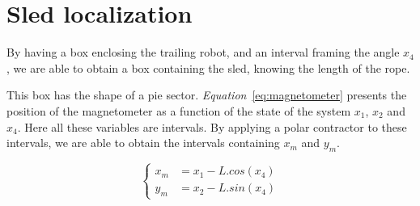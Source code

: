 \section*{Sled localization}
    By having a box enclosing the trailing robot, and an interval framing the angle $x_4$, we are able to obtain a box containing the sled, knowing the length of the rope.
    
    This box has the shape of a pie sector. \textit{Equation}~\ref{eq:magnetometer} presents the position of the magnetometer as a function of the state of the system $x_1$, $x_2$ and $x_4$. Here all these variables are intervals. By applying a polar contractor to these intervals, we are able to obtain the intervals containing $x_m$ and $y_m$.

    \begin{equation}\label{eq:magnetometer}
        \left\lbrace
            \begin{aligned}
                x_m &= x_1 - L.cos(x_4) \\
                y_m &= x_2 - L.sin(x_4)
            \end{aligned}
        \right.
    \end{equation}